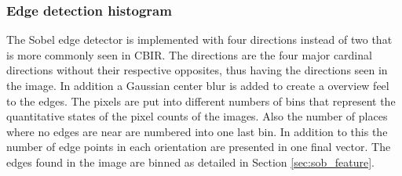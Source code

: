\subsubsection{Edge detection histogram}
\label{sec:meth:featextr:edge}
The Sobel edge detector is implemented with four directions instead of two that is more commonly seen in CBIR. The directions are the four major cardinal directions without their respective opposites, thus having the directions seen in the image. In addition a Gaussian center blur is added to create a overview feel to the edges. The pixels are put into different numbers of bins that represent the quantitative states of the pixel counts of the images. Also the number of places where no edges are near are numbered into one last bin. In addition to this the number of edge points in each orientation are presented in one final vector. The edges found in the image are binned as detailed in Section \ref{sec:sob_feature}.




